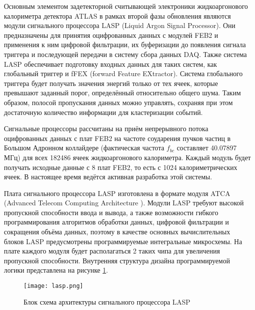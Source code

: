 Основным элементом задетекторной считывающей электроники жидкоаргонового калориметра детектора ATLAS в рамках второй фазы обновления являются модули сигнального процессора LASP (Liquid Argon Signal Processor). Они предназначены для принятия оцифрованных данных с модулей FEB2 и применения к ним цифровой фильтрации, их буферизации до появления сигнала триггера и последующей передачи в систему сбора данных DAQ. Также система LASP обеспечивает подготовку входных данных для таких систем, как глобальный триггер и fFEX (forward Feature EXtractor). Система глобального триггера будет получать значения энергий только от тех ячеек, которые превышают заданный порог, определённый относительно общего шума. Таким образом, полосой пропускания данных можно управлять, сохраняя при этом достаточную количество информации для кластеризации событий.\par
Сигнальные процессоры рассчитаны на приём непрерывного потока оцифрованных данных с плат FEB2 на частоте соударения пучков частиц в Большом Адронном коллайдере (фактическая частота $f_{bc}$ составляет 40.07897 МГц) для всех 182486 ячеек жидкоаргонового калориметра. Каждый модуль будет получать исходные данные с 8 плат FEB2, то есть с 1024 калориметрических ячеек. В настоящее время ведётся активная разработка этой системы.\par
Плата сигнального процессора LASP изготовлена в формате модуля ATCA (Advanced Telecom Computing Architecture \parencite{atca}). Модули LASP требуют высокой пропускной способности ввода и вывода, а также возможности гибкого программирования алгоритмов обработки данных, цифровой фильтрации и сокращения объёма данных, поэтому в качестве основных вычислительных блоков LASP предусмотрены программируемые интегральные микросхемы. На плате каждого модуля будет располагаться 2 таких чипа для увеличения пропускной способности. Внутренняя структура дизайна программируемой логики представлена на рисунке \ref{fig:lasp}.

\begin{figure}[ht]
    \centering
    \texttt{[image: lasp.png]}
    \caption{Блок схема архитектуры сигнального процессора LASP}
    \label{fig:lasp}
\end{figure}\par

